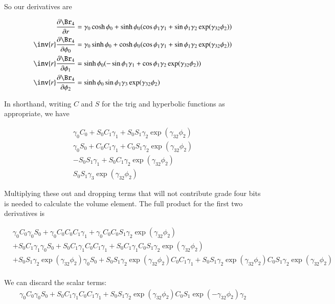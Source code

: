 So our derivatives are

\begin{align*}
\PD{r}{\Br_4} &= \gamma_0 \cosh \phi_0 + \sinh\phi_0 ( \cos\phi_1 \gamma_1 + \sin\phi_1 \gamma_2 \exp( \gamma_{32} \phi_2 )) \\
\inv{r}\PD{\phi_0}{\Br_4} &= \gamma_0 \sinh \phi_0 + \cosh\phi_0 ( \cos\phi_1 \gamma_1 + \sin\phi_1 \gamma_2 \exp( \gamma_{32} \phi_2 )) \\
\inv{r}\PD{\phi_1}{\Br_4} &= \sinh\phi_0 ( -\sin\phi_1 \gamma_1 + \cos\phi_1 \gamma_2 \exp( \gamma_{32} \phi_2 )) \\
\inv{r}\PD{\phi_2}{\Br_4} &= \sinh\phi_0 \sin\phi_1 \gamma_3 \exp( \gamma_{32} \phi_2 )
\end{align*}

In shorthand, writing $C$ and $S$ for the trig and hyperbolic functions as appropriate, we have

\begin{align*}
\gamma_0 C_0 + S_0 C_1 \gamma_1 + S_0 S_1 \gamma_2 \exp( \gamma_{32} \phi_2 )  \\
\gamma_0 S_0 + C_0 C_1 \gamma_1 + C_0 S_1 \gamma_2 \exp( \gamma_{32} \phi_2 )  \\
 -S_0 S_1 \gamma_1 + S_0 C_1 \gamma_2 \exp( \gamma_{32} \phi_2 )  \\
S_0 S_1 \gamma_3 \exp( \gamma_{32} \phi_2 )
\end{align*}

Multiplying these out and dropping terms that will not contribute grade four bits is needed to calculate the volume element.  
The full product for the first two derivatives is

\begin{align*}
&\gamma_0 C_0 \gamma_0 S_0
+\gamma_0 C_0 C_0 C_1 \gamma_1
+\gamma_0 C_0 C_0 S_1 \gamma_2 \exp( \gamma_{32} \phi_2 ) \\
&+S_0 C_1 \gamma_1 \gamma_0 S_0
+S_0 C_1 \gamma_1 C_0 C_1 \gamma_1
+S_0 C_1 \gamma_1 C_0 S_1 \gamma_2 \exp( \gamma_{32} \phi_2 ) \\
&+S_0 S_1 \gamma_2 \exp( \gamma_{32} \phi_2 ) \gamma_0 S_0
+S_0 S_1 \gamma_2 \exp( \gamma_{32} \phi_2 ) C_0 C_1 \gamma_1
+S_0 S_1 \gamma_2 \exp( \gamma_{32} \phi_2 ) C_0 S_1 \gamma_2 \exp( \gamma_{32} \phi_2 ) \\
\end{align*}

We can discard the scalar terms:
\begin{align*}
\gamma_0 C_0 \gamma_0 S_0 +S_0 C_1 \gamma_1 C_0 C_1 \gamma_1 +S_0 S_1 \gamma_2 \exp( \gamma_{32} \phi_2 ) C_0 S_1 \exp( -\gamma_{32} \phi_2 ) \gamma_2 
\end{align*}

